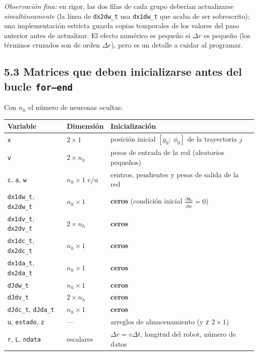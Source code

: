 \documentclass[11pt,a4paper]{article}
\newcommand{\td}[2]{\frac{\overline{\partial #1}}{\overline{\partial #2}}}
\begin{document}
\emph{Observación fina:} en rigor, las dos filas de cada grupo deberían actualizarse \emph{simultáneamente} (la línea de \texttt{dx2dw\_t} usa \texttt{dx1dw\_t} que acaba de ser sobrescrito); una implementación estricta guarda copias temporales de los valores del paso anterior antes de actualizar. El efecto numérico es pequeño si $\Delta r$ es pequeño (los términos cruzados son de orden $\Delta r$), pero es un detalle a cuidar al programar.

\subsection*{5.3 Matrices que deben inicializarse antes del bucle \texttt{for--end}}

Con $n_h$ el número de neuronas ocultas:

\begin{center}
\renewcommand{\arraystretch}{1.3}
\small
\begin{tabular}{l l l}
\toprule
Variable & Dimensión & Inicialización\\
\midrule
\texttt{x} & $2\times1$ & posición inicial $[y_0;\ \phi_0]$ de la trayectoria $j$\\
\texttt{v} & $2\times n_h$ & pesos de entrada de la red (aleatorios pequeños)\\
\texttt{c}, \texttt{a}, \texttt{w} & $n_h\times1$ c/u & centros, pendientes y pesos de salida de la red\\
\texttt{dx1dw\_t}, \texttt{dx2dw\_t} & $n_h\times1$ & \textbf{ceros} (condición inicial $\td{\mathbf x_0}{w}=0$)\\
\texttt{dx1dv\_t}, \texttt{dx2dv\_t} & $2\times n_h$ & \textbf{ceros}\\
\texttt{dx1dc\_t}, \texttt{dx2dc\_t} & $n_h\times1$ & \textbf{ceros}\\
\texttt{dx1da\_t}, \texttt{dx2da\_t} & $n_h\times1$ & \textbf{ceros}\\
\texttt{dJdw\_t} & $n_h\times1$ & \textbf{ceros}\\
\texttt{dJdv\_t} & $2\times n_h$ & \textbf{ceros}\\
\texttt{dJdc\_t}, \texttt{dJda\_t} & $n_h\times1$ & \textbf{ceros}\\
\texttt{u}, \texttt{estado}, \texttt{z} & --- & arreglos de almacenamiento (y \texttt{z} $2\times1$)\\
\texttt{r}, \texttt{L}, \texttt{ndata} & escalares & $\Delta r=v\Delta t$, longitud del robot, número de datos\\
\bottomrule
\end{tabular}
\end{center}
\end{document}
